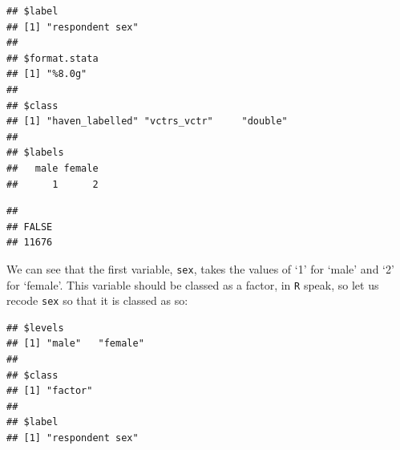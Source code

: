 \documentclass[
]{book}
\newenvironment{Shaded}{\begin{snugshade}}{\end{snugshade}}
\newcommand{\CommentTok}[1]{\textcolor[rgb]{0.56,0.35,0.01}{\textit{#1}}}
\newcommand{\FunctionTok}[1]{\textcolor[rgb]{0.00,0.00,0.00}{#1}}
\newcommand{\NormalTok}[1]{#1}
\newcommand{\OtherTok}[1]{\textcolor[rgb]{0.56,0.35,0.01}{#1}}
\newcommand{\SpecialCharTok}[1]{\textcolor[rgb]{0.00,0.00,0.00}{#1}}
\begin{document}
\begin{Shaded}
\end{Shaded}

\begin{verbatim}
## $label
## [1] "respondent sex"
## 
## $format.stata
## [1] "%8.0g"
## 
## $class
## [1] "haven_labelled" "vctrs_vctr"     "double"        
## 
## $labels
##   male female 
##      1      2
\end{verbatim}

\begin{Shaded}
\end{Shaded}

\begin{verbatim}
## 
## FALSE 
## 11676
\end{verbatim}

We can see that the first variable, \texttt{sex}, takes the values of `1' for `male' and `2' for `female'. This variable should be classed as a factor, in \texttt{R} speak, so let us recode \texttt{sex} so that it is classed as so:

\begin{Shaded}
\end{Shaded}

\begin{verbatim}
## $levels
## [1] "male"   "female"
## 
## $class
## [1] "factor"
## 
## $label
## [1] "respondent sex"
\end{verbatim}
\end{document}

